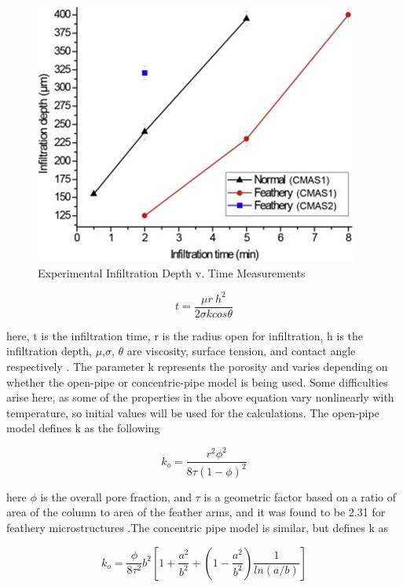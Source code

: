 \documentclass[conf]{new-aiaa}
\begin{document}
\begin{figure}
    \centering
    \includegraphics{Figures/RaviInfilDepth.jpg}
    \caption{Experimental Infiltration Depth v. Time Measurements}
    \label{fig:RaviInfilDepth}
\end{figure}

\begin{equation}
    t=\frac{\mu r\ h^2}{2\sigma k cos\theta}
\end{equation}

\noindent here, t is the infiltration time, r is the radius open for infiltration, h is the infiltration depth, $\mu$,$ \sigma$, $\theta$ are viscosity, surface tension, and contact angle respectively \cite{Naraparaju2017,ZHAO201474}. The parameter k represents the porosity and varies depending on whether the open-pipe or concentric-pipe model is being used. Some difficulties arise here, as some of the properties in the above equation vary nonlinearly with temperature, so initial values will be used for the calculations. The open-pipe model defines k as the following

\begin{equation}
    k_o=\frac{r^2\phi^2}{8\tau\left(1-\phi\right)^2}
\end{equation}

\noindent here $\phi$ is the overall pore fraction, and $\tau$ is a geometric factor based on a ratio of area of the column to area of the feather arms, and it was found to be 2.31 for feathery microstructures \cite{Naraparaju2019}.The concentric pipe model is similar, but defines k as

\begin{equation}
    k_o=\frac{\phi}{8\tau^2}b^2\left[1+\frac{a^2}{b^2}+\left(1-\frac{a^2}{b^2}\right)\frac{1}{ln\left(a/b\right)}\right]
\end{equation}
\end{document}
